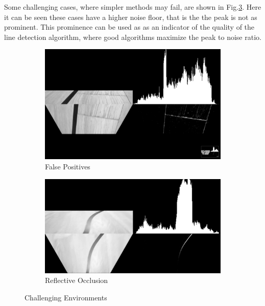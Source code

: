         Some challenging cases, where simpler methods may fail, are shown in Fig.\ref{fig:ChallengingEnvironments}.
        Here it can be seen these cases have a higher noise floor, that is the the peak is not as prominent. 
        This prominence can be used as as an indicator of the quality of the line detection algorithm, where good algorithms 
        maximize the peak to noise ratio.

        \begin{figure}[H]
            \centering
            \begin{subfigure}[b]{0.45\textwidth}
                \includegraphics[width=\textwidth]{vizEnvNoise.png}
                \caption{False Positives}
                \label{fig:FalsePositives}
            \end{subfigure}
            \hfill
            \begin{subfigure}[b]{0.45\textwidth}
                \includegraphics[width=\textwidth]{vizLightOclusion.png}
                \caption{Reflective Occlusion}
                \label{fig:ReflectOcclusion}
            \end{subfigure}
            \caption{Challenging Environments}
            \label{fig:ChallengingEnvironments}
        \end{figure}

